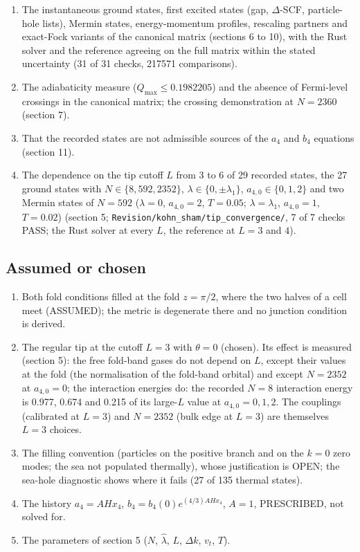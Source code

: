 \documentclass[11pt]{article}
\begin{document}
\begin{enumerate}
\item The instantaneous ground states, first excited states (gap, $\Delta$-SCF, particle-hole lists), Mermin states, energy-momentum profiles, rescaling partners and exact-Fock variants of the canonical matrix (sections 6 to 10), with the Rust solver and the reference agreeing on the full matrix within the stated uncertainty (31 of 31 checks, 217571 comparisons).
\item The adiabaticity measure ($Q_{\max} \leq 0.1982205$) and the absence of Fermi-level crossings in the canonical matrix; the crossing demonstration at $N = 2360$ (section 7).
\item That the recorded states are not admissible sources of the $a_4$ and $b_4$ equations (section 11).
\item The dependence on the tip cutoff $L$ from 3 to 6 of 29 recorded states, the 27 ground states with $N \in \{8, 592, 2352\}$, $\lambda \in \{0, \pm\lambda_1\}$, $a_{4,0} \in \{0, 1, 2\}$ and two Mermin states of $N = 592$ ($\lambda = 0$, $a_{4,0} = 2$, $T = 0.05$; $\lambda = \lambda_1$, $a_{4,0} = 1$, $T = 0.02$) (section 5; \texttt{Revision\allowbreak{}/kohn\_sh\allowbreak{}am/tip\_c\allowbreak{}onvergen\allowbreak{}ce/}, 7 of 7 checks PASS; the Rust solver at every $L$, the reference at $L = 3$ and $4$).
\end{enumerate}

\subsection{Assumed or chosen}

\begin{enumerate}
\item Both fold conditions filled at the fold $z = \pi/2$, where the two halves of a cell meet (ASSUMED); the metric is degenerate there and no junction condition is derived.
\item The regular tip at the cutoff $L = 3$ with $\theta = 0$ (chosen). Its effect is measured (section 5): the free fold-band gases do not depend on $L$, except their values at the fold (the normalisation of the fold-band orbital) and except $N = 2352$ at $a_{4,0} = 0$; the interaction energies do: the recorded $N = 8$ interaction energy is 0.977, 0.674 and 0.215 of its large-$L$ value at $a_{4,0} = 0, 1, 2$. The couplings (calibrated at $L = 3$) and $N = 2352$ (bulk edge at $L = 3$) are themselves $L = 3$ choices.
\item The filling convention (particles on the positive branch and on the $k = 0$ zero modes; the sea not populated thermally), whose justification is OPEN; the sea-hole diagnostic shows where it fails (27 of 135 thermal states).
\item The history $a_4 = AHx_4$, $b_4 = b_4(0)e^{(4/3)AHx_4}$, $A = 1$, PRESCRIBED, not solved for.
\item The parameters of section 5 ($N$, $\hat\lambda$, $L$, $\Delta k$, $v_t$, $T$).
\end{enumerate}
\end{document}
